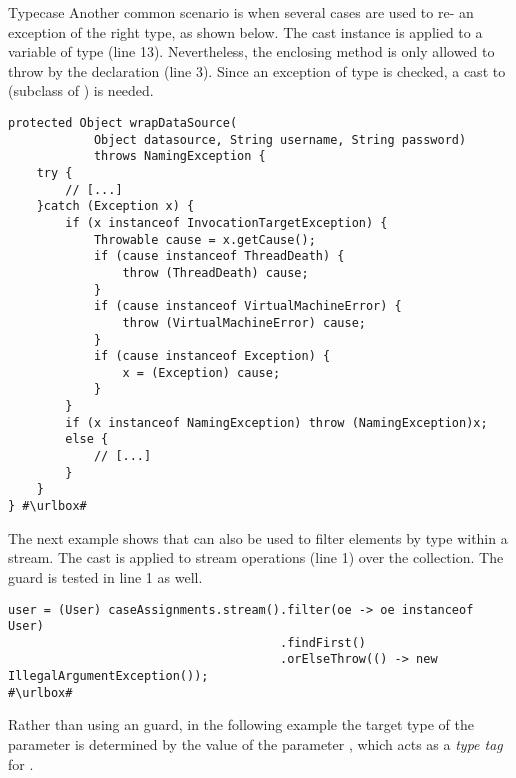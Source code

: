 \begin{pattern}{Typecase}
Another common scenario is when several cases are used to re-
an exception of the right type, as shown below.
The cast instance is applied to a variable of type 
(line 13).
Nevertheless, the enclosing method is only allowed to throw  by the  declaration (line 3).
Since an exception of type  is checked,
a cast to  (subclass of ) is needed.

\def\urlvar{http://bit.ly/codefollower_Tomcat_Research_2SGDUG5}
\begin{verbatim}
protected Object wrapDataSource(
			Object datasource, String username, String password)
			throws NamingException {
	try {
		// [...]
	}catch (Exception x) {
		if (x instanceof InvocationTargetException) {
			Throwable cause = x.getCause();
			if (cause instanceof ThreadDeath) {
				throw (ThreadDeath) cause;
			}
			if (cause instanceof VirtualMachineError) {
				throw (VirtualMachineError) cause;
			}
			if (cause instanceof Exception) {
				x = (Exception) cause;
			}
		}
		if (x instanceof NamingException) throw (NamingException)x;
		else {
			// [...]
		}
	}
} #\urlbox#
\end{verbatim}

The next example shows that \thisp{} can also be used to filter elements by type within a stream.
The cast is applied to stream operations (line 1) over the  collection.
The  guard is tested in line 1 as well.

\def\urlvar{http://bit.ly/kiegroup_jbpm_2ENCL8a}
\begin{verbatim}
user = (User) caseAssignments.stream().filter(oe -> oe instanceof User)
                                      .findFirst()
                                      .orElseThrow(() -> new IllegalArgumentException());
#\urlbox#
\end{verbatim}

Rather than using an  guard, in the following example
the target type of the parameter  is determined by the value
of the parameter ,
which acts as a \emph{type tag} for .


\end{pattern}
